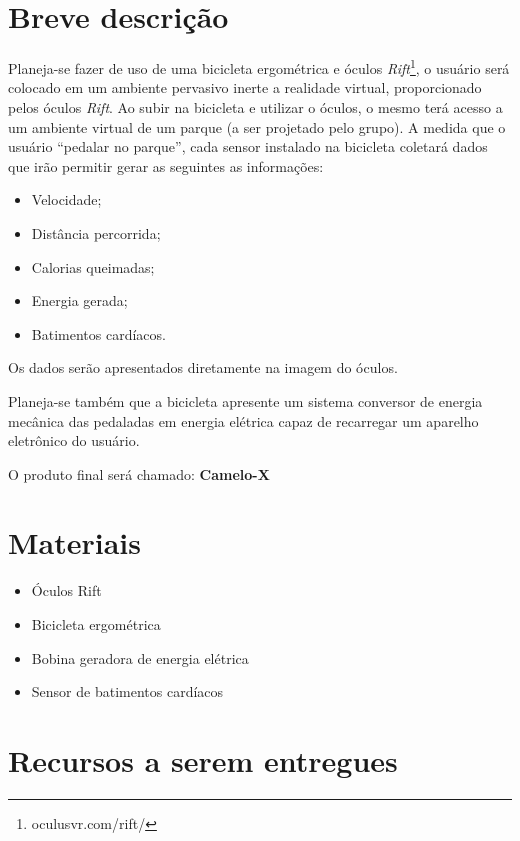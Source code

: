 \section{Breve descrição}\label{sec}

Planeja-se fazer de uso de  uma bicicleta ergométrica e óculos
\textit{Rift}\footnote{oculusvr.com/rift/}, o usuário será colocado em um 
ambiente pervasivo inerte a realidade virtual, proporcionado pelos óculos 
\textit{Rift}. Ao subir na bicicleta e utilizar o óculos, o mesmo terá acesso 
a um ambiente virtual de um parque (a ser projetado pelo grupo). A medida que 
o usuário “pedalar no parque”, cada sensor instalado na bicicleta coletará 
dados que irão permitir gerar as seguintes as informações:
\begin{itemize}
	\item Velocidade;
	\item Distância percorrida;
	\item Calorias queimadas;
	\item Energia gerada;
	\item Batimentos cardíacos.
\end{itemize}

Os dados serão apresentados diretamente na imagem do óculos. 

Planeja-se também que a bicicleta apresente um sistema conversor de
energia mecânica das pedaladas em energia elétrica capaz de recarregar um aparelho eletrônico do usuário.

O produto final será chamado: {\bf Camelo-X}

\section{Materiais} %
\label{sec:materiais}

\begin{itemize}%
	\item Óculos Rift \checkmark
	\item Bicicleta ergométrica \checkmark
	\item Bobina geradora de energia elétrica
	\item Sensor de batimentos cardíacos 
\end{itemize}

\section{Recursos a serem entregues}


